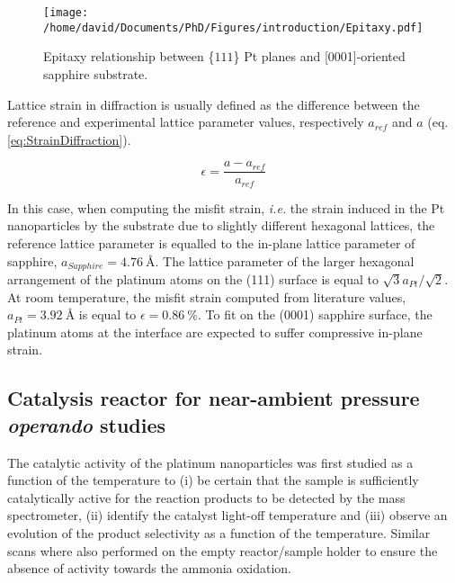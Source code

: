 \begin{figure}
    \centering
    \texttt{[image: /home/david/Documents/PhD/Figures/introduction/Epitaxy.pdf]}
    \caption{
        Epitaxy relationship between \{$111$\} Pt planes and [0001]-oriented sapphire substrate.
    }
    \label{fig:Epitaxy}
\end{figure}%

Lattice strain in diffraction is usually defined as the difference between the reference and experimental lattice parameter values, respectively $a_{ref}$ and $a$ (eq. \ref{eq:StrainDiffraction}).

\begin{equation}
    \epsilon = \frac{a - a_{ref}}{a_{ref}}
    \label{eq:StrainDiffraction}
\end{equation}

In this case, when computing the misfit strain, \textit{i.e.} the strain induced in the Pt nanoparticles by the substrate due to slightly different hexagonal lattices, the reference lattice parameter is equalled to the in-plane lattice parameter of sapphire, $a_{Sapphire} = \qty{4.76}{\angstrom}$.
The lattice parameter of the larger hexagonal arrangement of the platinum atoms on the (111) surface is equal to $\sqrt{3} a_{Pt} / \sqrt{2}$.
At room temperature, the misfit strain computed from literature values, $a_{Pt} = \qty{3.92}{\angstrom}$ \parencite{Waseda1975} is equal to $\epsilon = \qty{0.86}{\percent}$.
To fit on the (0001) sapphire surface, the platinum atoms at the interface are expected to suffer compressive in-plane strain.

\subsection{Catalysis reactor for near-ambient pressure \textit{operando} studies}

The catalytic activity of the platinum nanoparticles was first studied as a function of the temperature to (i) be certain that the sample is sufficiently catalytically active for the reaction products to be detected by the mass spectrometer, (ii) identify the catalyst light-off temperature and (iii) observe an evolution of the product selectivity as a function of the temperature.
Similar scans where also performed on the empty reactor/sample holder to ensure the absence of activity towards the ammonia oxidation.

